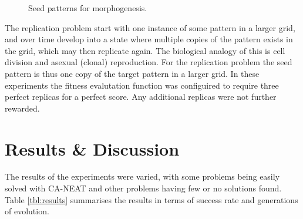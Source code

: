 \begin{figure}[h]
\caption{Seed patterns for morphogenesis.}
\label{fig:seed}
\end{figure}

The replication problem start with one instance of some pattern in a larger grid,
and over time develop into a state where multiple copies of the pattern exists in the grid,
which may then replicate again.
The biological analogy of this is cell division and asexual (clonal) reproduction.
For the replication problem the seed pattern is thus one copy of the target pattern in a larger grid.
In these experiments the fitness evalutation function was configuired to require three perfect replicas for a perfect score.
Any additional replicas were not further rewarded.


\section{Results \& Discussion}
The results of the experiments were varied, with some problems being easily solved with CA-NEAT and other problems having few or no solutions found.
Table \ref{tbl:results} summarises the results in terms of success rate and generations of evolution.

